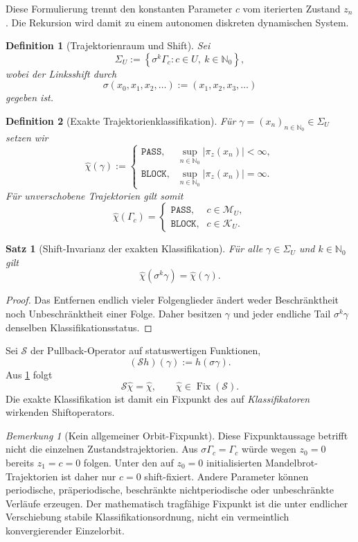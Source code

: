 \documentclass[11pt,a4paper]{article}
\newtheorem{definition}{Definition}[section]
\newtheorem{satz}{Satz}[section]
\theoremstyle{remark}
\newtheorem{bemerkung}{Bemerkung}[section]
\newcommand{\M}{\mathcal{M}}
\newcommand{\K}{\mathcal{K}}
\newcommand{\N}{\mathbb{N}}
\newcommand{\Fix}{\operatorname{Fix}}
\newcommand{\PASS}{\texttt{PASS}}
\newcommand{\BLOCK}{\texttt{BLOCK}}
\begin{document}
Diese Formulierung trennt den konstanten Parameter \(c\) vom iterierten
Zustand \(z_n\). Die Rekursion wird damit zu einem autonomen diskreten
dynamischen System.

\begin{definition}[Trajektorienraum und Shift]
Sei
\[
  \Sigma_U:=\left\{\sigma^k\Gamma_c:c\in U,\ k\in\N_0\right\},
\]
wobei der Linksshift durch
\[
  \sigma(x_0,x_1,x_2,\ldots):=(x_1,x_2,x_3,\ldots)
\]
gegeben ist.
\end{definition}

\begin{definition}[Exakte Trajektorienklassifikation]
Für \(\gamma=(x_n)_{n\in\N_0}\in\Sigma_U\) setzen wir
\[
  \widehat\chi(\gamma):=
  \begin{cases}
    \PASS,&\sup_{n\in\N_0}|\pi_z(x_n)|<\infty,\\[0.25em]
    \BLOCK,&\sup_{n\in\N_0}|\pi_z(x_n)|=\infty.
  \end{cases}
\]
Für unverschobene Trajektorien gilt somit
\[
  \widehat\chi(\Gamma_c)=
  \begin{cases}
    \PASS,&c\in\M_U,\\
    \BLOCK,&c\in\K_U.
  \end{cases}
\]
\end{definition}

\begin{satz}[Shift-Invarianz der exakten Klassifikation]
\label{satz:shift-invarianz}
Für alle \(\gamma\in\Sigma_U\) und \(k\in\N_0\) gilt
\[
  \widehat\chi(\sigma^k\gamma)=\widehat\chi(\gamma).
\]
\end{satz}

\begin{proof}
Das Entfernen endlich vieler Folgenglieder ändert weder Beschränktheit noch
Unbeschränktheit einer Folge. Daher besitzen \(\gamma\) und jeder endliche
Tail \(\sigma^k\gamma\) denselben Klassifikationsstatus.
\end{proof}

Sei \(\mathcal S\) der Pullback-Operator auf statuswertigen Funktionen,
\[
  (\mathcal S h)(\gamma):=h(\sigma\gamma).
\]
Aus \cref{satz:shift-invarianz} folgt
\[
  \boxed{\mathcal S\widehat\chi=\widehat\chi},
  \qquad
  \widehat\chi\in\Fix(\mathcal S).
\]
Die exakte Klassifikation ist damit ein Fixpunkt des auf
\emph{Klassifikatoren} wirkenden Shiftoperators.

\begin{bemerkung}[Kein allgemeiner Orbit-Fixpunkt]
Diese Fixpunktaussage betrifft nicht die einzelnen Zustandstrajektorien. Aus
\(\sigma\Gamma_c=\Gamma_c\) würde wegen \(z_0=0\) bereits \(z_1=c=0\)
folgen. Unter den auf \(z_0=0\) initialisierten Mandelbrot-Trajektorien ist
daher nur \(c=0\) shift-fixiert. Andere Parameter können periodische,
präperiodische, beschränkte nichtperiodische oder unbeschränkte Verläufe
erzeugen. Der mathematisch tragfähige Fixpunkt ist die unter endlicher
Verschiebung stabile Klassifikationsordnung, nicht ein vermeintlich
konvergierender Einzelorbit.
\end{bemerkung}
\end{document}

